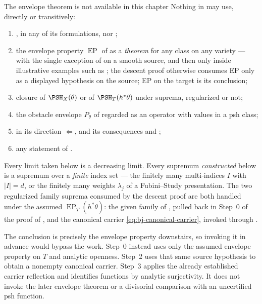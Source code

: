\begin{warning}{The envelope theorem is not available in this chapter}
\label{warn:ch41-firewall}
Nothing in  may use, directly or transitively:
\begin{enumerate}
\item {}, in any of its formulations, nor
      ;
\item the envelope property $\operatorname{EP}$ of
       as a \emph{theorem} for any class on
      any variety --- with the single exception of
       on a smooth source, and then only
      inside illustrative examples such as ;
      the descent proof otherwise consumes EP only as a displayed
      hypothesis on the source; EP on the target is its conclusion;
\item closure of $\PSH_X(\theta)$ or of $\PSH_T(h^*\theta)$ under
      suprema, regularized or not;
\item the obstacle envelope $P_\theta$ of
       regarded as an operator with values in
      a psh class;
\item {} in its direction
      $\Leftarrow$, and its consequences
       and
      ;
\item any statement of .
\end{enumerate}
Every limit taken below is a decreasing limit.  Every supremum
\emph{constructed} below is a supremum over a \emph{finite} index set ---
the finitely many multi-indices $I$ with $|I|=d$, or the finitely many
weights $\lambda_j$ of a Fubini--Study presentation.  The two regularized family suprema consumed by the descent proof
are both handled under the assumed
$\operatorname{EP}_T(h^*\theta)$: the given family of
, pulled back in Step~0 of the proof of
, and the canonical carrier
\eqref{eq:bj-canonical-carrier}, invoked through
.
\end{warning}

\begin{remark}
\label{rem:ch41-firewall-not-vacuous}
The conclusion is precisely the envelope property downstairs, so
invoking it in advance would bypass the work.  Step~0 instead uses only
the assumed envelope property on $T$ and analytic openness.  Step~2
uses that same source hypothesis to obtain a nonempty canonical carrier.
Step~3 applies the already established carrier reflection and identifies
functions by analytic surjectivity.  It does not invoke the later
envelope theorem or a divisorial comparison with an uncertified psh
function.
\end{remark}

